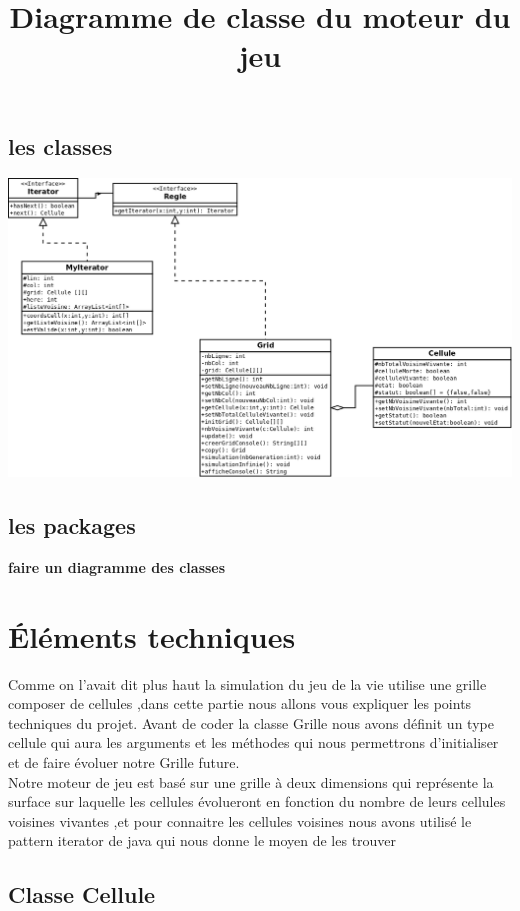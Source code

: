 \documentclass[a4paper,12pt]{article} %
\begin{document}
\subsection{les classes }
\begin{center}
\includegraphics[scale=0.3]{images/classes.png}\\
\title{Diagramme de classe du moteur du jeu }	
\end{center}


 

\subsection{les packages}
\textbf{faire un diagramme des classes}
\section{Éléments techniques}
Comme on l'avait dit plus haut la simulation du jeu de la vie utilise une grille composer de cellules ,dans cette partie nous allons vous expliquer les points techniques du projet. Avant de coder la classe Grille nous avons définit un type cellule qui aura les arguments et les méthodes qui nous permettrons d'initialiser et de faire évoluer notre Grille future.\\

Notre moteur de jeu est basé sur une grille à deux dimensions qui représente la surface sur laquelle les cellules évolueront en fonction du nombre de leurs cellules voisines vivantes ,et pour connaitre les cellules voisines nous avons utilisé le pattern iterator de java qui nous donne le moyen de les trouver  
\subsection{Classe Cellule}
\end{document}
